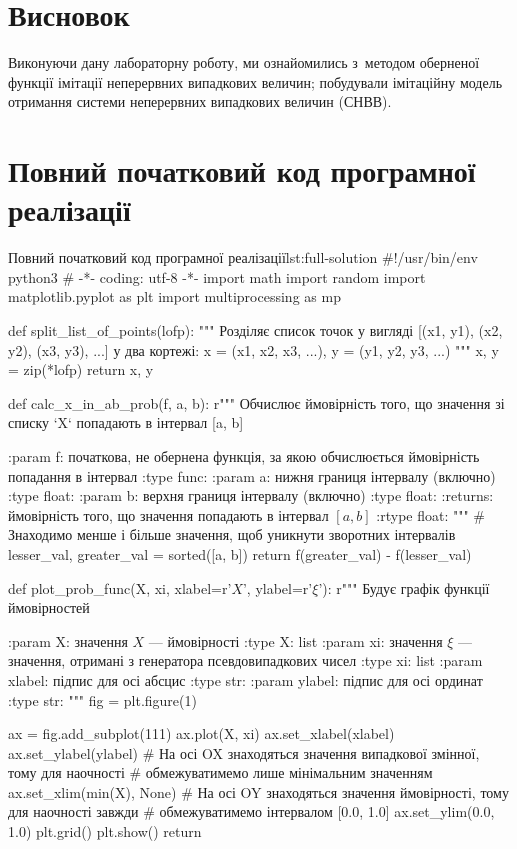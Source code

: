 \documentclass[
	a4paper,
	oneside,
	BCOR = 10mm,
	DIV = 12,
	12pt,
	headings = normal,
]{scrartcl}
\begin{document}
		\section{Висновок}
			Виконуючи дану лабораторну роботу, ми ознайомились з~методом оберненої функції імітації неперервних випадкових величин; побудували імітаційну модель отримання системи неперервних випадкових величин (СНВВ).

		\appendix
		\section{Повний початковий код програмної реалізації}
		\label{sec:full-listing}
			\begin{listingpython}[toprule = 0pt, bottomrule = 0pt]{Повний початковий код програмної реалізації}{lst:full-solution}
#!/usr/bin/env python3
# -*- coding: utf-8 -*-
import math
import random
import matplotlib.pyplot as plt
import multiprocessing as mp


def split_list_of_points(lofp):
    """
    Розділяє список точок у вигляді [(x1, y1), (x2, y2), (x3, y3), ...]
    у два кортежі: x = (x1, x2, x3, ...), y = (y1, y2, y3, ...)
    """
    x, y = zip(*lofp)
    return x, y


def calc_x_in_ab_prob(f, a, b):
    r"""
    Обчислює ймовірність того, що значення зі списку `X` попадають в інтервал
    [a, b]

    :param f: початкова, не обернена функція, за якою обчислюється ймовірність
        попадання в інтервал
    :type func:
    :param a: нижня границя інтервалу (включно)
    :type float:
    :param b: верхня границя інтервалу (включно)
    :type float:
    :returns: ймовірність того, що значення попадають в інтервал $[a, b]$
    :rtype float:
    """
    # Знаходимо менше і більше значення, щоб уникнути зворотних інтервалів
    lesser_val, greater_val = sorted([a, b])
    return f(greater_val) - f(lesser_val)


def plot_prob_func(X, xi, xlabel=r'$X$', ylabel=r'$\xi$'):
    r""" Будує графік функції ймовірностей

    :param X: значення $X$ — ймовірності
    :type X: list
    :param xi: значення $\xi$ — значення, отримані з генератора
        псевдовипадкових чисел
    :type xi: list
    :param xlabel: підпис для осі абсцис
    :type str:
    :param ylabel: підпис для осі ординат
    :type str:
    """
    fig = plt.figure(1)

    ax = fig.add_subplot(111)
    ax.plot(X, xi)
    ax.set_xlabel(xlabel)
    ax.set_ylabel(ylabel)
    # На осі OX знаходяться значення випадкової змінної, тому для наочності
    # обмежуватимемо лише мінімальним значенням
    ax.set_xlim(min(X), None)
    # На осі OY знаходяться значення ймовірності, тому для наочності завжди
    # обмежуватимемо інтервалом [0.0, 1.0]
    ax.set_ylim(0.0, 1.0)
    plt.grid()
    plt.show()
    return



\end{listingpython}
\end{document}
